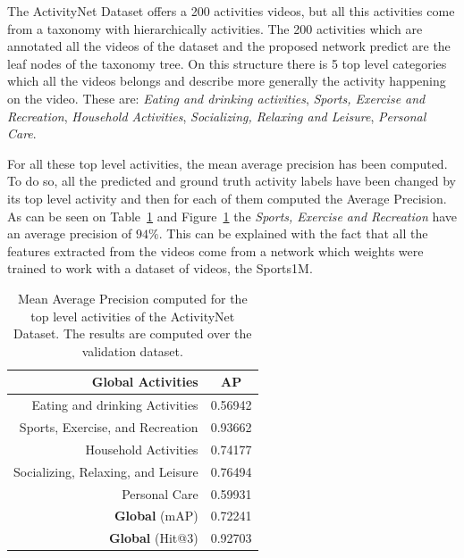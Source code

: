 The ActivityNet Dataset offers a 200 activities videos, but all this activities come from a taxonomy with hierarchically activities. The 200 activities which are annotated all the videos of the dataset and the proposed network predict are the leaf nodes of the taxonomy tree. On this structure there is 5 top level categories which all the videos belongs and describe more generally the activity happening on the video. These are: \textit{Eating and drinking activities}, \textit{Sports, Exercise and Recreation}, \textit{Household Activities}, \textit{Socializing, Relaxing and Leisure}, \textit{Personal Care}.

For all these top level activities, the mean average precision has been computed. To do so, all the predicted and ground truth activity labels have been changed by its top level activity and then for each of them computed the Average Precision. As can be seen on Table~\ref{table:top_level_classification_ap} and Figure~\ref{table:top_level_classification_ap} the \textit{Sports, Exercise and Recreation} have an average precision of $94\%$. This can be explained with the fact that all the features extracted from the videos come from a network which weights were trained to work with a dataset of videos, the Sports1M\cite{KarpathyCVPR14}.

\begin{table}[H]
\begin{center}
\begin{tabular}{|r|c|}
\hline
\textbf{Global Activities} & \textbf{AP} \\
\hline\hline
Eating and drinking Activities & 0.56942 \\
Sports, Exercise, and Recreation & 0.93662 \\
Household Activities & 0.74177 \\
Socializing, Relaxing, and Leisure & 0.76494 \\
Personal Care & 0.59931 \\
\hline\hline
\textbf{Global} (mAP) & 0.72241 \\
\textbf{Global} (Hit@3) & 0.92703 \\
\hline
\end{tabular}
\end{center}
\caption{Mean Average Precision computed for the top level activities of the ActivityNet Dataset. The results are computed over the validation dataset.}
\label{table:top_level_classification_ap}
\end{table}

